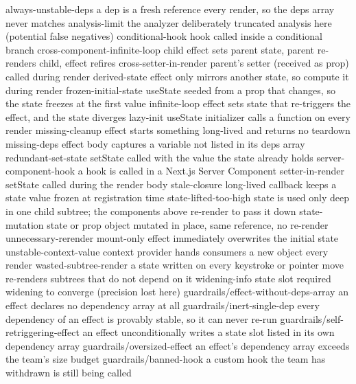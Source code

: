 \begin{sortie}
  always-unstable-deps                  a dep is a fresh reference every render, so the deps array never matches
  analysis-limit                        the analyzer deliberately truncated analysis here (potential false negatives)
  conditional-hook                      hook called inside a conditional branch
  cross-component-infinite-loop         child effect sets parent state, parent re-renders child, effect refires
  cross-setter-in-render                parent's setter (received as prop) called during render
  derived-state                         effect only mirrors another state, so compute it during render
  frozen-initial-state                  useState seeded from a prop that changes, so the state freezes at the first value
  infinite-loop                         effect sets state that re-triggers the effect, and the state diverges
  lazy-init                             useState initializer calls a function on every render
  missing-cleanup                       effect starts something long-lived and returns no teardown
  missing-deps                          effect body captures a variable not listed in its deps array
  redundant-set-state                   setState called with the value the state already holds
  server-component-hook                 a hook is called in a Next.js Server Component
  setter-in-render                      setState called during the render body
  stale-closure                         long-lived callback keeps a state value frozen at registration time
  state-lifted-too-high                 state is used only deep in one child subtree; the components above re-render to pass it down
  state-mutation                        state or prop object mutated in place, same reference, no re-render
  unnecessary-rerender                  mount-only effect immediately overwrites the initial state
  unstable-context-value                context provider hands consumers a new object every render
  wasted-subtree-render                 a state written on every keystroke or pointer move re-renders subtrees that do not depend on it
  widening-info                         state slot required widening to converge (precision lost here)
  guardrails/effect-without-deps-array  an effect declares no dependency array at all
  guardrails/inert-single-dep           every dependency of an effect is provably stable, so it can never re-run
  guardrails/self-retriggering-effect   an effect unconditionally writes a state slot listed in its own dependency array
  guardrails/oversized-effect           an effect's dependency array exceeds the team's size budget
  guardrails/banned-hook                a custom hook the team has withdrawn is still being called
\end{sortie}
